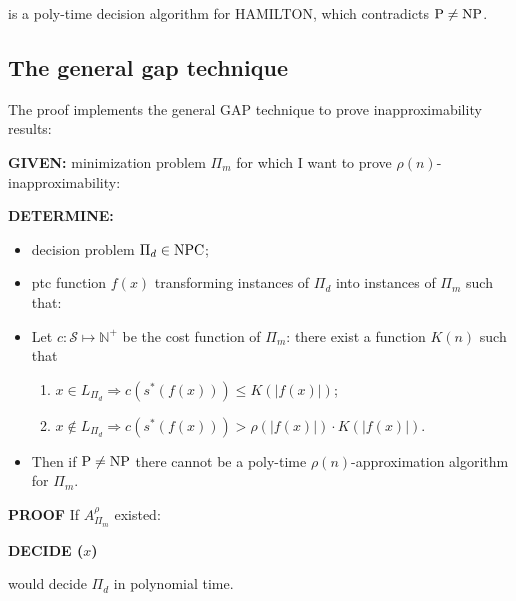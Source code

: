 is a poly-time decision algorithm for HAMILTON, which contradicts $\mathrm{P}\ne\mathrm{NP}$.

\subsection{The general gap technique}
The proof implements the general GAP technique to prove inapproximability results:

\textbf{GIVEN:} minimization problem $\Pi_m$ for which I want to prove $\rho(n)$-inapproximability:

\textbf{DETERMINE:}
\begin{itemize}
\item decision problem $\Pi_d\in\mathrm{NPC}$;
\item ptc function $f(x)$ transforming instances of $\Pi_d$ into instances of $\Pi_m$ such that:
\item Let $c:\mathcal S\mapsto\mathbb N^+$ be the cost function of $\Pi_m$: there exist a function $K(n)$ such that
\begin{enumerate}
\item $x\in L_{\Pi_d}\Rightarrow c(s^*(f(x)))\leq K(|f(x)|)$;
\item $x\notin L_{\Pi_d}\Rightarrow c(s^*(f(x)))>\rho(|f(x)|)\cdot K(|f(x)|)$.
\end{enumerate}
\item Then if $\mathrm{P}\ne\mathrm{NP}$ there cannot be a poly-time $\rho(n)$-approximation algorithm for $\Pi_m$.
\end{itemize}
\textbf{PROOF} If $A_{\Pi_m}^\rho$ existed:
\begin{notesalgorithm}
\textbf{DECIDE ($x$)}
\begin{notespseudocode}
\end{notespseudocode}
\end{notesalgorithm}
would decide $\Pi_d$ in polynomial time.

